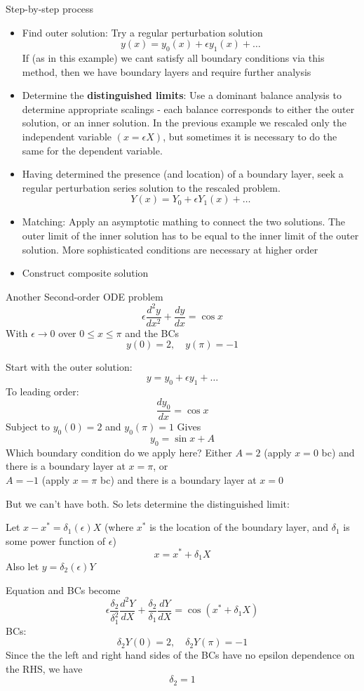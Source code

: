 \documentclass{X:/Documents/Coding/Latex/myassignment}
\begin{document}
Step-by-step process
\begin{itemize}
    \item Find outer solution:
    Try a regular perturbation solution
    \[y(x) = y_0(x) + \epsilon y_1(x) + \ldots\]
    If (as in this example) we cant satisfy all boundary conditions via this method, then we have boundary layers and require further analysis
    \item Determine the \textbf{distinguished limits}: Use a dominant balance analysis to determine appropriate scalings - each balance corresponds to either the outer solution, or an inner solution. In the previous example we rescaled only the independent variable $(x = \epsilon X)$, but sometimes it is necessary to do the same for the dependent variable.
    \item Having determined the presence (and location) of a boundary layer, seek a regular perturbation series solution to the rescaled problem. 
    \[Y(x) = Y_0 + \epsilon Y_1(x) + \ldots\]
    \item Matching: Apply an asymptotic mathing to connect the two solutions. The outer limit of the inner solution has to be equal to the inner limit of the outer solution. More sophisticated conditions are necessary at higher order
    \item Construct composite solution
\end{itemize}

Another Second-order ODE problem
\[\epsilon \frac{d^2y}{dx^2} + \frac{dy}{dx} = \cos x\]
With $\epsilon \to 0$ over $0\leq x \leq \pi$ and the BCs
\[y(0) = 2, \quad y(\pi) = -1\]

Start with the outer solution:
\[y = y_0 + \epsilon y_1 + \ldots\]
To leading order:
\[\frac{dy_0}{dx} = \cos x\]
Subject to $y_0(0) = 2$ and $y_0(\pi) = 1$
Gives
\[y_0 = \sin x + A\]
Which boundary condition do we apply here?
Either $A = 2$ (apply $x=0$ bc) and there is a boundary layer at $x=\pi$, or\\
$A = -1$ (apply $x=\pi$ bc) and there is a boundary layer at $x = 0$

But we can't have both. So lets determine the distinguished limit:

Let $x - x^* = \delta_1(\epsilon) X$ (where $x^*$ is the location of the boundary layer, and $\delta_1$ is some power function of $\epsilon$) 
\[x = x^* + \delta_1 X\]
Also let $y = \delta_2(\epsilon)Y$

Equation and BCs become
\[\epsilon \frac{\delta_2}{\delta_1^2} \frac{d^2 Y}{dX} + \frac{\delta_2}{\delta_1} \frac{dY}{dX} = \cos(x^* + \delta_1 X)\]
BCs:
\[\delta_2 Y(0) = 2,\quad \delta_2 Y(\pi) = -1\]
Since the the left and right hand sides of the BCs have no epsilon dependence on the RHS, we have
\[\delta_2 = 1\]
\end{document}
